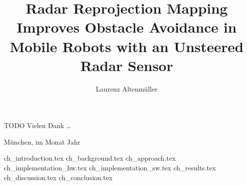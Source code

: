 \documentclass[%
    fontsize=12pt,
    headinclude,
    paper=a4,
    numbers=noenddot,
    listof=totoc,
    bibliography=totoc,
    index=totoc,
]{diplomarbeit}
\title{Radar Reprojection Mapping Improves Obstacle Avoidance in Mobile Robots with an Unsteered Radar Sensor}
\author{Laurenz Altenmüller}
\begin{document}
\maketitle

\renewcommand{\thepage}{}
\cleardoublepage 



\pagestyle{empty}
\cleardoublepage 
\setcounter{page}{3}	%
\renewcommand{\thepage}{\roman{page}}
\begin{danksagung}
    TODO Vielen Dank \dots
    
    München, im Monat Jahr
\end{danksagung}


\clearpage
\pagestyle{headings}
\tableofcontents





\newpage{\pagestyle{plain}\cleardoublepage}
\rmfamily
\renewcommand{\thepage}{\arabic{page}}
\setcounter{page}{1}

{ch_introduction.tex}
{ch_background.tex}
{ch_approach.tex}
{ch_implementation_hw.tex}
{ch_implementation_sw.tex}
{ch_results.tex}
{ch_discussion.tex}
{ch_conclusion.tex}


\clearpage
\begin{appendix}




\end{appendix}

\listoffigures
\listoftables

\clearpage
\printindex

\clearpage
\printbibliography
\end{document}
